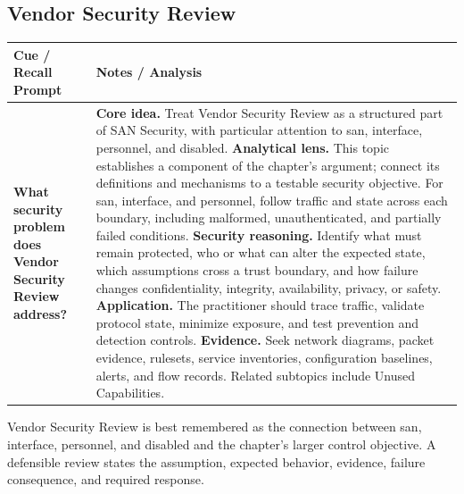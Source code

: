 \documentclass[11pt]{article}
\newcommand{\CornellHeader}{%
\rowcolor{Navy}\color{white}\bfseries Cue / Recall Prompt & \color{white}\bfseries Notes / Analysis\\\hline}
\newcommand{\CornellRow}[2]{%
\cellcolor{CueGray}\RaggedRight\textbf{#1} & \RaggedRight #2\\\hline}
\begin{document}
\subsection*{Vendor Security Review}
\begin{longtable}{>{\RaggedRight\arraybackslash}p{}|>{\RaggedRight\arraybackslash}p{}}
\CornellHeader
\CornellRow{What security problem does Vendor Security Review address?}{\textbf{Core idea.} Treat Vendor Security Review as a structured part of SAN Security, with particular attention to san, interface, personnel, and disabled. \textbf{Analytical lens.} This topic establishes a component of the chapter's argument; connect its definitions and mechanisms to a testable security objective. For san, interface, and personnel, follow traffic and state across each boundary, including malformed, unauthenticated, and partially failed conditions. \textbf{Security reasoning.} Identify what must remain protected, who or what can alter the expected state, which assumptions cross a trust boundary, and how failure changes confidentiality, integrity, availability, privacy, or safety. \textbf{Application.} The practitioner should trace traffic, validate protocol state, minimize exposure, and test prevention and detection controls. \textbf{Evidence.} Seek network diagrams, packet evidence, rulesets, service inventories, configuration baselines, alerts, and flow records. Related subtopics include Unused Capabilities.}
\end{longtable}
\begin{topicsummary}
Vendor Security Review is best remembered as the connection between san, interface, personnel, and disabled and the chapter's larger control objective. A defensible review states the assumption, expected behavior, evidence, failure consequence, and required response.
\end{topicsummary}
\end{document}
